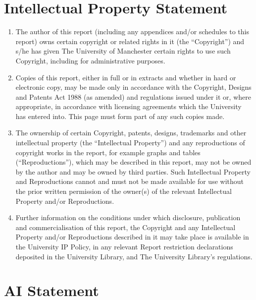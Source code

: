 \documentclass[12pt,a4paper,oneside]{report}
\begin{document}
\chapter*{Intellectual Property Statement}
\begin{enumerate}[label=\roman*.]
\item The author of this report (including any appendices and/or schedules to this report) owns certain copyright or related rights in it (the ``Copyright'') and s/he has given The University of Manchester certain rights to use such Copyright, including for administrative purposes.
\item Copies of this report, either in full or in extracts and whether in hard or electronic copy, may be made only in accordance with the Copyright, Designs and Patents Act 1988 (as amended) and regulations issued under it or, where appropriate, in accordance with licensing agreements which the University has entered into. This page must form part of any such copies made.
\item The ownership of certain Copyright, patents, designs, trademarks and other intellectual property (the ``Intellectual Property'') and any reproductions of copyright works in the report, for example graphs and tables (``Reproductions''), which may be described in this report, may not be owned by the author and may be owned by third parties. Such Intellectual Property and Reproductions cannot and must not be made available for use without the prior written permission of the owner(s) of the relevant Intellectual Property and/or Reproductions.
\item Further information on the conditions under which disclosure, publication and commercialisation of this report, the Copyright and any Intellectual Property and/or Reproductions described in it may take place is available in the University IP Policy, in any relevant Report restriction declarations deposited in the University Library, and The University Library's regulations.
\end{enumerate}
\clearpage

\chapter*{AI Statement}

\clearpage







\clearpage
\singlespacing
{}
\renewcommand{\bibname}{References}


\appendix
\onehalfspacing

\end{document}
